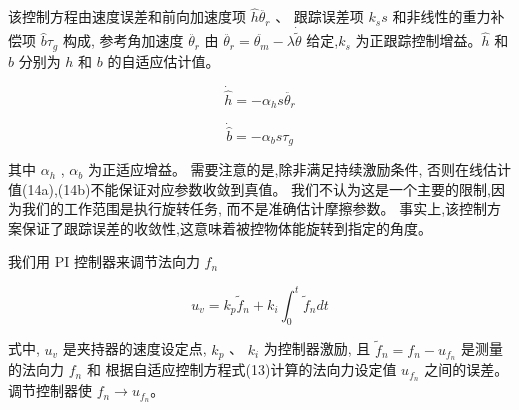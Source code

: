 该控制方程由速度误差和前向加速度项 $\hat h{\ddot {\theta _r}}$ 、
跟踪误差项 $k_s s$ 和非线性的重力补偿项 $\hat b{\tau _g}$ 构成,
参考角加速度 ${\ddot {\theta _r}}$ 由
${\ddot {\theta _r}} = {\ddot {\theta _m}} - \lambda \dot {\tilde \theta}$
给定,$k_s$ 为正跟踪控制增益。$\hat h$ 和$\hat b$ 分别为 $h$ 和 $b$ 的自适应估计值。

\vspace{-15pt}
\begin{equation}
  \dot {\hat h} =  - {\alpha _h}s{\ddot {\theta _r}}
\end{equation}

\vspace{-15pt}
\begin{equation}
  \dot {\hat b} =  - {\alpha _b}s{\tau _g}
\end{equation}

\noindent 其中 $\alpha_h$ , $\alpha_b$ 为正适应增益。
需要注意的是,除非满足持续激励条件,
否则在线估计值(14a),(14b)不能保证对应参数收敛到真值。
我们不认为这是一个主要的限制,因为我们的工作范围是执行旋转任务,
而不是准确估计摩擦参数。
事实上,该控制方案保证了跟踪误差的收敛性,这意味着被控物体能旋转到指定的角度。


我们用 PI 控制器来调节法向力 $f_n$

\vspace{-15pt}
\begin{equation}
  {u_v} = {k_p}{\tilde f_n} + {k_i}\int_0^t {{{\tilde f}_n}dt}
\end{equation}

\noindent 式中, $u_v$ 是夹持器的速度设定点, $k_p$ 、 $k_i$ 为控制器激励,
且 ${\tilde f_n} = {f_n} - {u_{{f_n}}}$ 是测量的法向力 $f_n$ 和
根据自适应控制方程式(13)计算的法向力设定值 $u_{f_n}$ 之间的误差。
调节控制器使 ${f_n} \to {u_{{f_n}}}$。

